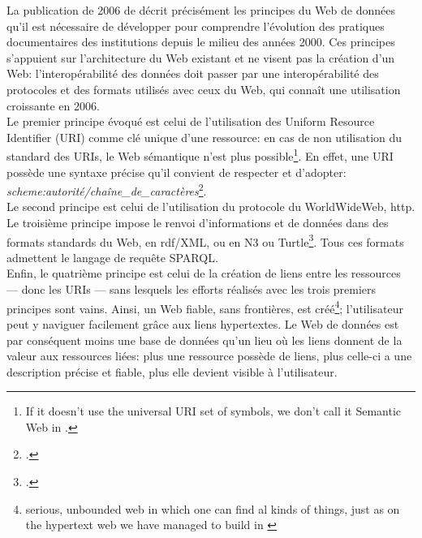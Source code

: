 La publication de 2006 de  décrit précisément les principes du Web de données qu'il est nécessaire de développer pour comprendre l'évolution des pratiques documentaires des institutions depuis le milieu des années 2000. Ces principes s'appuient sur l'architecture du Web existant et ne visent pas la création d'un Web: l'interopérabilité des données doit passer par une interopérabilité des protocoles et des formats utilisés avec ceux du Web, qui connaît une utilisation croissante en 2006.\\

Le premier principe évoqué est celui de l'utilisation des Uniform Resource Identifier (URI) comme clé unique d'une ressource: en cas de non utilisation du standard des URIs, le Web sémantique n'est plus possible\footnote{\og If it doesn't use the universal URI set of symbols, we don't call it Semantic Web\fg{} in \cite{berners-lee_linked_2006}.}. En effet, une URI possède une syntaxe précise qu'il convient de respecter et d'adopter: \textit{scheme:autorité/chaîne\_de\_caractères}\footcite[§40]{bermes_convergence_2013}.\\

Le second principe est celui de l'utilisation du protocole du WorldWideWeb, \ac{http}.\\

Le troisième principe impose le renvoi d'informations et de données dans des formats standards du Web, en \ac{rdf}/XML, ou en N3 ou Turtle\footcite{berners-lee_linked_2006}. Tous ces formats admettent le langage de requête SPARQL.\\

Enfin, le quatrième principe est celui de la création de liens entre les ressources --- donc les URIs --- sans lesquels les efforts réalisés avec les trois premiers principes sont vains. Ainsi, un Web fiable, sans frontières, est créé\footnote{\og serious, unbounded web in which one can find al kinds of things, just as on the hypertext web we have managed to build\fg{} in \cite{berners-lee_linked_2006}}; l'utilisateur peut y naviguer facilement grâce aux liens hypertextes. Le Web de données est par conséquent moins une base de données qu'un lieu où les liens donnent de la valeur aux ressources liées: plus une ressource possède de liens, plus celle-ci a une description précise et fiable, plus elle devient visible à l'utilisateur.\\

